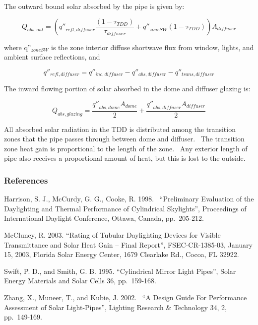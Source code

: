 The outward bound solar absorbed by the pipe is given by:

\begin{equation}
{Q_{abs,out}} = \left( {{{q''}_{refl,diffuser}}\frac{{\left( {1 - {\tau_{TDD}}} \right)}}{{{\tau_{diffuser}}}} + {{q''}_{zoneSW}}\left( {1 - {\tau_{TDD}}} \right)} \right){A_{diffuser}}
\end{equation}

where q''\(_{zoneSW}\) is the zone interior diffuse shortwave flux from window, lights, and ambient surface reflections, and

\begin{equation}
{q''_{refl,diffuser}} = {q''_{inc,diffuser}} - {q''_{abs,diffuser}} - {q''_{trans,diffuser}}
\end{equation}

The inward flowing portion of solar absorbed in the dome and diffuser glazing is:

\begin{equation}
{Q_{abs,glazing}} = \frac{{{{q''}_{abs,dome}}{A_{dome}}}}{2} + \frac{{{{q''}_{abs,diffuser}}{A_{diffuser}}}}{2}
\end{equation}

All absorbed solar radiation in the TDD is distributed among the transition zones that the pipe passes through between dome and diffuser.~ The transition zone heat gain is proportional to the length of the zone.~ Any exterior length of pipe also receives a proportional amount of heat, but this is lost to the outside.

\subsubsection{References}\label{references-016}

Harrison, S. J., McCurdy, G. G., Cooke, R. 1998.~ ``Preliminary Evaluation of the Daylighting and Thermal Performance of Cylindrical Skylights'', Proceedings of International Daylight Conference, Ottawa, Canada, pp.~205-212.

McCluney, R. 2003. ``Rating of Tubular Daylighting Devices for Visible Transmittance and Solar Heat Gain -- Final Report'', FSEC-CR-1385-03, January 15, 2003, Florida Solar Energy Center, 1679 Clearlake Rd., Cocoa, FL 32922.

Swift, P. D., and Smith, G. B. 1995. ``Cylindrical Mirror Light Pipes'', Solar Energy Materials and Solar Cells 36, pp.~159-168.

Zhang, X., Muneer, T., and Kubie, J. 2002.~ ``A Design Guide For Performance Assessment of Solar Light-Pipes'', Lighting Research \& Technology 34, 2, pp.~149-169.

